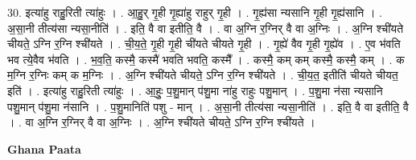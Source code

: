 \documentclass[17pt]{extarticle}
\begin{document}
30. इत्या॑हु राहु॒रिती त्या॑हुः । . आ॒हु॒र् गृ॒ही गृ॒ह्या॑हु राहुर् गृ॒ही । . गृ॒ह्य॑सा न्यसानि गृ॒ही गृ॒ह्य॑सानि । . अ॒सा॒नी तीत्य॑सा न्यसा॒नीति॑ । . इति॒ वै वा इतीति॒ वै । . वा अ॒ग्नि र॒ग्निर् वै वा अ॒ग्निः । . अ॒ग्नि श्ची॑यते चीयते॒ ऽग्नि र॒ग्नि श्ची॑यते । . ची॒य॒ते॒ गृ॒ही गृ॒ही ची॑यते चीयते गृ॒ही । . गृ॒ह्ये॑ वैव गृ॒ही गृ॒ह्ये॑व । . ए॒व भ॑वति भव त्ये॒वैव भ॑वति । . भ॒व॒ति॒ कस्मै॒ कस्मै॑ भवति भवति॒ कस्मै᳚ । . कस्मै॒ कम् कम् कस्मै॒ कस्मै॒ कम् । . क म॒ग्नि र॒ग्निः कम् क म॒ग्निः । . अ॒ग्नि श्ची॑यते चीयते॒ ऽग्नि र॒ग्नि श्ची॑यते । . ची॒य॒त॒ इतीति॑ चीयते चीयत॒ इति॑ । . इत्या॑हु राहु॒रिती त्या॑हुः । . आ॒हुः॒ प॒शु॒मान् प॑शु॒मा ना॑हु राहुः पशु॒मान् । . प॒शु॒मा न॑सा न्यसानि पशु॒मान् प॑शु॒मा न॑सानि । . प॒शु॒मानिति॑ पशु - मान् । . अ॒सा॒नी तीत्य॑सा न्यसा॒नीति॑ । . इति॒ वै वा इतीति॒ वै । . वा अ॒ग्नि र॒ग्निर् वै वा अ॒ग्निः । . अ॒ग्नि श्ची॑यते चीयते॒ ऽग्नि र॒ग्नि श्ची॑यते । \newline

\textbf{Ghana Paata } \newline
\end{document}
